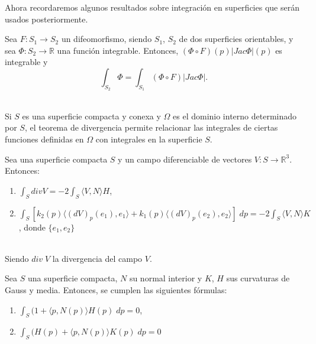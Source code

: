 Ahora recordaremos algunos resultados sobre integración en superficies que serán usados posteriormente.
${}$\\

\begin{teorema}
	Sea $F : S_1 \to S_2$ un difeomorfismo, siendo $S_1$, $S_2$ de dos superficies orientables, y sea $\Phi : S_2 \to \mathbb{R}$ una función integrable. Entonces, $(\Phi \circ F)(p)|Jac \Phi|(p)$ es integrable y
	\[
	\int_{S_2} \Phi = \int_{S_1} (\Phi \circ F)|Jac \Phi|.
	\]
\end{teorema}
${ }$\\


Si $S$ es una superficie compacta y conexa y $\Omega$ es el dominio interno determinado por $S$, el teorema de divergencia permite relacionar las integrales de ciertas funciones definidas en $\Omega$ con integrales en la superficie $S$.
${ }$\\

\begin{teorema} \label{teo:divergencia}
	Sea una superficie compacta $S$ y un campo diferenciable de vectores $V : S \to \mathbb{R}^3$. Entonces:
	\begin{enumerate}
		\item $\int_S div V = -2 \int_S \langle V, N \rangle H$,
		\item $\int_S [k_2(p) \langle (dV)_p(e_1), e_1\rangle + k_1(p) \langle (dV)_p(e_2), e_2 \rangle ] \; dp = -2 \int_S \langle V, N \rangle K$, donde $\{ e_1, e_2 \}$
	\end{enumerate}
\end{teorema}
${}$\\

Siendo $div \; V$ la divergencia del campo $V$.
${ }$\\

\begin{teorema}
	Sea $S$ una superficie compacta, $N$ su normal interior y $K$, $H$ sus curvaturas de Gauss y media. Entonces, se cumplen las siguientes fórmulas:
	\begin{enumerate}
		\item $\int_S (1 + \langle p, N(p) \rangle H(p) \; dp = 0$,
		\item $\int_S (H(p) + \langle p, N(p) \rangle K(p) \; dp = 0$
	\end{enumerate}
\end{teorema}
${ }$\\







